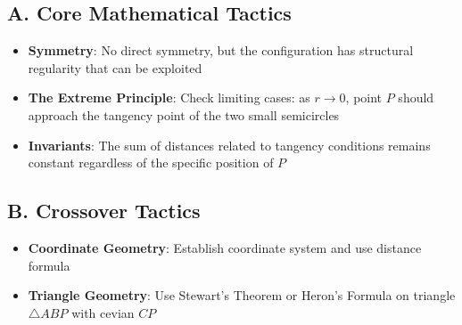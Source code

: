 \documentclass[]{article}
\begin{document}
\begin{tacticalbox}
\subsection*{A. Core Mathematical Tactics}
\begin{itemize}[leftmargin=*]
    \item \textbf{Symmetry}: No direct symmetry, but the configuration has structural regularity that can be exploited
    \item \textbf{The Extreme Principle}: Check limiting cases: as $r \to 0$, point $P$ should approach the tangency point of the two small semicircles
    \item \textbf{Invariants}: The sum of distances related to tangency conditions remains constant regardless of the specific position of $P$
\end{itemize}

\subsection*{B. Crossover Tactics}
\begin{itemize}[leftmargin=*]
    \item \textbf{Coordinate Geometry}: Establish coordinate system and use distance formula
    \item \textbf{Triangle Geometry}: Use Stewart's Theorem or Heron's Formula on triangle $\triangle ABP$ with cevian $CP$
\end{itemize}
\end{tacticalbox}
\end{document}
